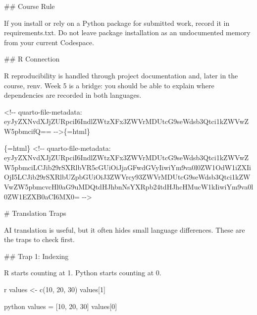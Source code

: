 \documentclass[
  letterpaper,
  DIV=11,
  numbers=noendperiod,
  oneside]{scrreprt}
\newenvironment{Shaded}{\begin{snugshade}}{\end{snugshade}}
\newcommand{\DecValTok}[1]{\textcolor[rgb]{0.68,0.00,0.00}{#1}}
\newcommand{\FunctionTok}[1]{\textcolor[rgb]{0.28,0.35,0.67}{#1}}
\newcommand{\InformationTok}[1]{\textcolor[rgb]{0.37,0.37,0.37}{#1}}
\newcommand{\NormalTok}[1]{\textcolor[rgb]{0.00,0.23,0.31}{#1}}
\newcommand{\OperatorTok}[1]{\textcolor[rgb]{0.37,0.37,0.37}{#1}}
\newcommand{\OtherTok}[1]{\textcolor[rgb]{0.00,0.23,0.31}{#1}}
\begin{document}
\begin{Shaded}
\begin{Highlighting}[numbers=left,,]
\FunctionTok{\#\# Course Rule}

\NormalTok{If you install or rely on a Python package for submitted work, record it in }\InformationTok{\textasciigrave{}requirements.txt\textasciigrave{}}\NormalTok{. Do not leave package installation as an undocumented memory from your current Codespace.}

\FunctionTok{\#\# R Connection}

\NormalTok{R reproducibility is handled through project documentation and, later in the course, }\InformationTok{\textasciigrave{}renv\textasciigrave{}}\NormalTok{. Week 5 is a bridge: you should be able to explain where dependencies are recorded in both languages.}


\InformationTok{\textasciigrave{}\textless{}!{-}{-} quarto{-}file{-}metadata: eyJyZXNvdXJjZURpciI6IndlZWtzXFx3ZWVrMDUtcG9seWdsb3Qtci1kZWVwZW5pbmcifQ== {-}{-}\textgreater{}\textasciigrave{}}\NormalTok{\{=html\}}

\InformationTok{\textasciigrave{}\textasciigrave{}\textasciigrave{}\{=html\}}
\InformationTok{\textless{}!{-}{-} quarto{-}file{-}metadata: eyJyZXNvdXJjZURpciI6IndlZWtzXFx3ZWVrMDUtcG9seWdsb3Qtci1kZWVwZW5pbmciLCJib29rSXRlbVR5cGUiOiJjaGFwdGVyIiwiYm9va0l0ZW1OdW1iZXIiOjI5LCJib29rSXRlbUZpbGUiOiJ3ZWVrcy93ZWVrMDUtcG9seWdsb3Qtci1kZWVwZW5pbmcvcHl0aG9uMDQtdHJhbnNsYXRpb24tdHJhcHMucW1kIiwiYm9va0l0ZW1EZXB0aCI6MX0= {-}{-}\textgreater{}}
\InformationTok{\textasciigrave{}\textasciigrave{}\textasciigrave{}}

\FunctionTok{\# Translation Traps }


\NormalTok{AI translation is useful, but it often hides small language differences. These are the traps to check first.}

\FunctionTok{\#\# Trap 1: Indexing}

\NormalTok{R starts counting at 1. Python starts counting at 0.}

\InformationTok{\textasciigrave{}\textasciigrave{}\textasciigrave{}r}
\NormalTok{values }\OtherTok{\textless{}{-}} \FunctionTok{c}\NormalTok{(}\DecValTok{10}\NormalTok{, }\DecValTok{20}\NormalTok{, }\DecValTok{30}\NormalTok{)}
\NormalTok{values[}\DecValTok{1}\NormalTok{]}
\InformationTok{\textasciigrave{}\textasciigrave{}\textasciigrave{}}

\InformationTok{\textasciigrave{}\textasciigrave{}\textasciigrave{}python}
\NormalTok{values }\OperatorTok{=}\NormalTok{ [}\DecValTok{10}\NormalTok{, }\DecValTok{20}\NormalTok{, }\DecValTok{30}\NormalTok{]}
\NormalTok{values[}\DecValTok{0}\NormalTok{]}
\InformationTok{\textasciigrave{}\textasciigrave{}\textasciigrave{}}


\end{Highlighting}
\end{Shaded}
\end{document}
